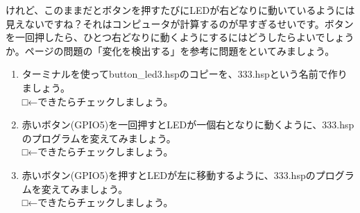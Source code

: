 けれど、このままだとボタンを押すたびにLEDが右どなりに動いているようには見えないですね？それはコンピュータが計算するのが早すぎるせいです。ボタンを一回押したら、ひとつ右どなりに動くようにするにはどうしたらよいでしょうか。\pageref{button_led2_toi}ページの問題の「変化を検出する」を参考に問題をといてみましょう。\\

\begin{tcolorbox}[title=\useOmetoi]
\begin{enumerate}
\item ターミナルを使ってbutton\_led3.hspのコピーを、333.hspという名前で作りましょう。\\
□←できたらチェックしましょう。
\item 赤いボタン(GPIO5)を一回押すとLEDが一個右となりに動くように、333.hspのプログラムを変えてみましょう。\\
□←できたらチェックしましょう。
\item 赤いボタン(GPIO5)を押すとLEDが左に移動するように、333.hspのプログラムを変えてみましょう。\\
□←できたらチェックしましょう。
\end{enumerate}
\end{tcolorbox}